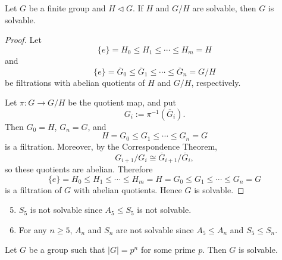 \begin{proposition}\label{prop-subgroupQuotientSolvableImpliesSolvable}
    Let $G$ be a finite group and $H\lhd G$. If $H$ and $G/H$ are solvable, then $G$ is solvable.
\end{proposition}

\begin{proof}
    Let
    \[
    \{e\}=H_0\leq H_1\leq\cdots\leq H_m=H
    \]
    and
    \[
    \{e\}=\overline G_0\leq \overline G_1\leq\cdots\leq \overline G_n=G/H
    \]
    be filtrations with abelian quotients of $H$ and $G/H$, respectively.

    Let $\pi:G\to G/H$ be the quotient map, and put
    \[
    G_i:=\pi^{-1}(\overline G_i).
    \]
    Then $G_0=H$, $G_n=G$, and
    \[
    H=G_0\leq G_1\leq\cdots\leq G_n=G
    \]
    is a filtration. Moreover, by the Correspondence Theorem,
    \[
    G_{i+1}/G_i\cong \overline G_{i+1}/\overline G_i,
    \]
    so these quotients are abelian. Therefore
    \[
    \{e\}=H_0\leq H_1\leq\cdots\leq H_m=H=G_0
    \leq G_1\leq\cdots\leq G_n=G
    \]
    is a filtration of $G$ with abelian quotients. Hence $G$ is solvable.
\end{proof}

\begin{example}
    \begin{enumerate}\setcounter{enumi}{4}
        \item $S_5$ is not solvable since $A_5\leq S_5$ is not solvable.
        \item For any $n\geq 5$, $A_n$ and $S_n$ are not solvable since
        $A_5\leq A_n$ and $S_5\leq S_n$.
    \end{enumerate}
\end{example}

\begin{proposition}
    Let $G$ be a group such that $|G|=p^n$ for some prime $p$. Then $G$ is solvable.
\end{proposition}

